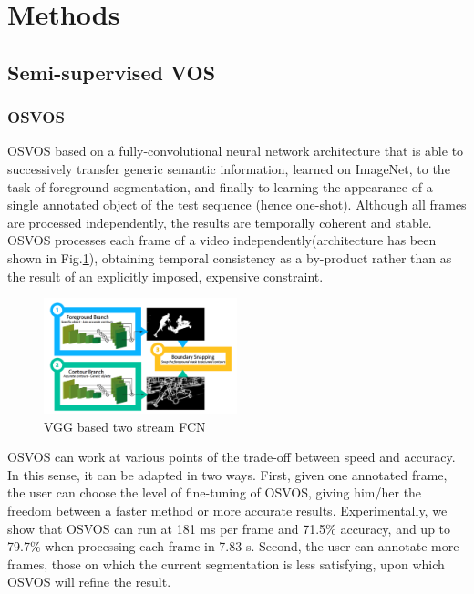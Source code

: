 \section{Methods}

\subsection{Semi-supervised VOS}
\subsubsection{OSVOS}
OSVOS\cite{OSVOS} based on a fully-convolutional neural network architecture that is able to successively transfer generic semantic information, learned on ImageNet\cite{Krizhevsky2012ImageNet}, to the task of foreground segmentation, and ﬁnally to learning the appearance of a single annotated object of the test sequence (hence one-shot). Although all frames are processed independently, the results are temporally coherent and stable. OSVOS processes each frame of a video independently(architecture has been shown in Fig.\ref{osvos_fcn}), obtaining temporal consistency as a by-product rather than as the result of an explicitly imposed, expensive constraint. 

\begin{figure}[ht]
    \centering
    \includegraphics[width=0.5\textwidth]{./figure/osvos_fcn.png}
    \caption{VGG based two stream FCN}
    \label{osvos_fcn}
\end{figure}

OSVOS can work at various points of the trade-off between speed and accuracy. In this sense, it can be adapted in two ways. First, given one annotated frame, the user can choose the level of ﬁne-tuning of OSVOS, giving him/her the freedom between a faster method or more accurate results. Experimentally, we show that OSVOS can run at 181 ms per frame and 71.5\% accuracy, and up to 79.7\% when processing each frame in 7.83 s. Second, the user can annotate more frames, those on which the current segmentation is less satisfying, upon which OSVOS will reﬁne the result.

